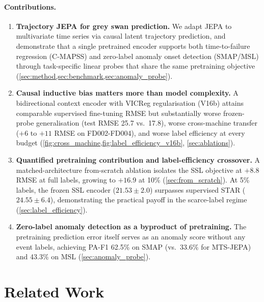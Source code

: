 \documentclass{article}
\begin{document}
\paragraph{Contributions.}
\begin{enumerate}[nosep]
  \item \textbf{Trajectory JEPA for grey swan prediction.} We adapt JEPA to multivariate time series via causal latent trajectory prediction, and demonstrate that a single pretrained encoder supports both time-to-failure regression (C-MAPSS) and zero-label anomaly onset detection (SMAP/MSL) through task-specific linear probes that share the same pretraining objective (\cref{sec:method,sec:benchmark,sec:anomaly_probe}).

  \item \textbf{Causal inductive bias matters more than model complexity.} A bidirectional context encoder with VICReg regularisation (V16b) attains comparable supervised fine-tuning RMSE but substantially worse frozen-probe generalisation (test RMSE 25.7 vs.\ 17.8), worse cross-machine transfer ($+6$ to $+11$ RMSE on FD002-FD004), and worse label efficiency at every budget (\cref{fig:cross_machine,fig:label_efficiency_v16b}, \cref{sec:ablations}).

  \item \textbf{Quantified pretraining contribution and label-efficiency crossover.} A matched-architecture from-scratch ablation isolates the SSL objective at $+8.8$ RMSE at full labels, growing to $+16.9$ at 10\% (\cref{sec:from_scratch}). At 5\% labels, the frozen SSL encoder ($21.53 \pm 2.0$) surpasses supervised STAR ($24.55 \pm 6.4$), demonstrating the practical payoff in the scarce-label regime (\cref{sec:label_efficiency}).

  \item \textbf{Zero-label anomaly detection as a byproduct of pretraining.} The pretraining prediction error itself serves as an anomaly score without any event labels, achieving PA-F1 62.5\% on SMAP (vs.\ 33.6\% for MTS-JEPA) and 43.3\% on MSL (\cref{sec:anomaly_probe}).
\end{enumerate}

\section{Related Work}
\label{sec:related}
\end{document}
